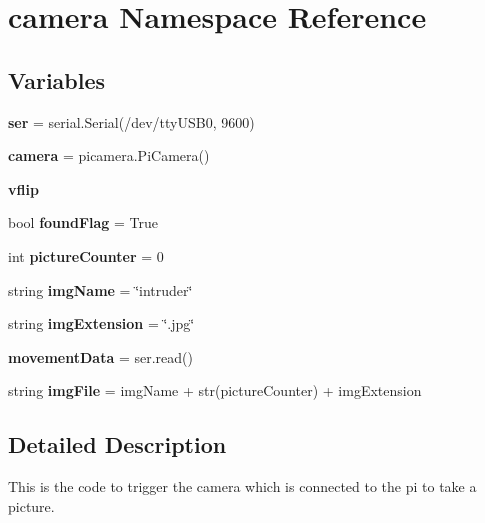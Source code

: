 \hypertarget{namespacecamera}{}\section{camera Namespace Reference}
\label{namespacecamera}
\subsection*{Variables}
\begin{DoxyCompactItemize}
\item 
\mbox{\label{namespacecamera_a93c2c649cb36c557294f0b008f8bbf3b}} 
{\bfseries ser} = serial.\+Serial(\textquotesingle{}/dev/tty\+U\+S\+B0\textquotesingle{}, 9600)
\item 
\mbox{\label{namespacecamera_a9aa65597c9f0f1a290fffaf8ef1a5bcc}} 
{\bfseries camera} = picamera.\+Pi\+Camera()
\item 
\mbox{\label{namespacecamera_a543d8fea29aa207c0443cef9b69caf57}} 
{\bfseries vflip}
\item 
\mbox{\label{namespacecamera_ad43bc45c94bef033ce35d043748f0004}} 
bool {\bfseries found\+Flag} = True
\item 
\mbox{\label{namespacecamera_aa9cfa65d995f7165d3799ac78db5f839}} 
int {\bfseries picture\+Counter} = 0
\item 
\mbox{\label{namespacecamera_ad4444b733711463f1cb0a328c5a41f49}} 
string {\bfseries img\+Name} = \char`\"{}intruder\char`\"{}
\item 
\mbox{\label{namespacecamera_acd8b88eead4d0dd2dc49f3e070972720}} 
string {\bfseries img\+Extension} = \char`\"{}.jpg\char`\"{}
\item 
\mbox{\label{namespacecamera_a57db776c12f449184c9a11d679417368}} 
{\bfseries movement\+Data} = ser.\+read()
\item 
\mbox{\label{namespacecamera_a4113737e99fc1721361a2f42072ecd20}} 
string {\bfseries img\+File} = img\+Name + str(picture\+Counter) + img\+Extension
\end{DoxyCompactItemize}


\subsection{Detailed Description}
\begin{DoxyVerb}This is the code to trigger the camera which is connected to
the pi to take a picture.
\end{DoxyVerb}
 